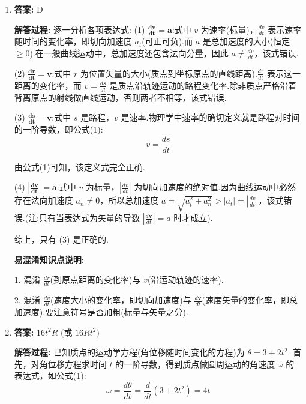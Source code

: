 \begin{enumerate}
\item[\textbf{1-7}]


\textbf{答案:} D

\textbf{解答过程:}
逐一分析各项表达式:
(1) $\mathbf{\frac{dv}{dt} = a}$:式中 $v$ 为速率(标量)，$\frac{dv}{dt}$ 表示速率随时间的变化率，即切向加速度 $a_t$(可正可负).而 $a$ 是总加速度的大小(恒定 $\ge 0$).在一般曲线运动中，总加速度还包含法向分量，因此 $a \neq \frac{dv}{dt}$，该式错误.

(2) $\mathbf{\frac{dr}{dt} = v}$:式中 $r$ 为位置矢量的大小(质点到坐标原点的直线距离).$\frac{dr}{dt}$ 表示这一距离的变化率，而 $v = \frac{ds}{dt}$ 是质点沿轨迹运动的路程变化率.除非质点严格沿着背离原点的射线做直线运动，否则两者不相等，该式错误.

(3) $\mathbf{\frac{ds}{dt} = v}$:式中 $s$ 是路程，$v$ 是速率.物理学中速率的确切定义就是路程对时间的一阶导数，即公式(1):
\begin{equation}
	v = \frac{ds}{dt}
\end{equation}

由公式(1)可知，该定义式完全正确.

(4) $\mathbf{\left| \frac{dv}{dt} \right| = a}$:式中 $v$ 为标量，$\left| \frac{dv}{dt} \right|$ 为切向加速度的绝对值.因为曲线运动中必然存在法向加速度 $a_n \neq 0$，所以总加速度 $a = \sqrt{a_t^2 + a_n^2} > |a_t| = \left| \frac{dv}{dt} \right|$，该式错误.(注:只有当表达式为矢量的导数 $\left| \frac{d\mathbf{v}}{dt} \right| = a$ 时才成立).

综上，只有 (3) 是正确的.

\textbf{易混淆知识点说明:}

1. 混淆 $\frac{dr}{dt}$(到原点距离的变化率)与 $v$(沿运动轨迹的速率).

2. 混淆 $\frac{dv}{dt}$(速度大小的变化率，即切向加速度)与 $\frac{d\mathbf{v}}{dt}$(速度矢量的变化率，即总加速度).要注意符号是否加粗(标量与矢量之分).

\vspace{2em}

\item[\textbf{1-12}]


\textbf{答案:} $16t^2 R$ (或 $16Rt^2$)

\textbf{解答过程:}
已知质点的运动学方程(角位移随时间变化的方程)为 $\theta = 3 + 2t^2$.
首先，对角位移方程求时间 $t$ 的一阶导数，得到质点做圆周运动的角速度 $\omega$ 的表达式，如公式(1):
\begin{equation}
	\omega = \frac{d\theta}{dt} = \frac{d}{dt}(3 + 2t^2) = 4t
\end{equation}


\end{enumerate}
